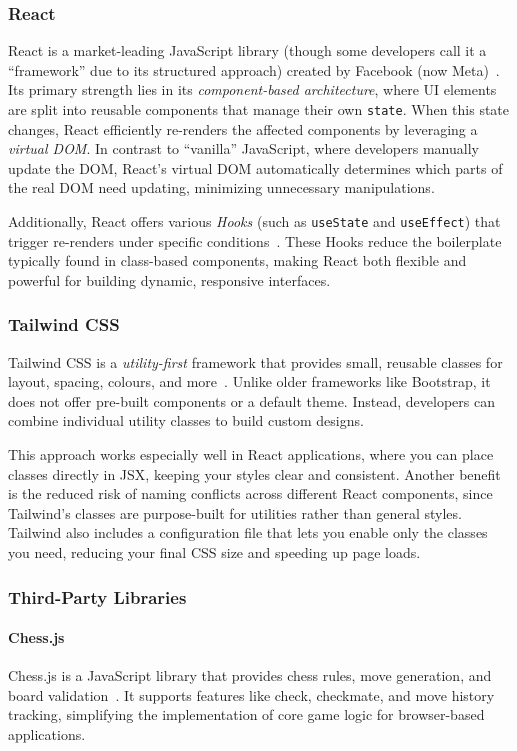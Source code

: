 \documentclass[12pt,a4paper]{article}
\begin{document}
\subsubsection*{React}
React is a market-leading JavaScript library (though some developers call it a “framework”
due to its structured approach) created by Facebook (now Meta)~\cite{ReactDocs}. Its primary strength lies in its \emph{component-based architecture}, where UI elements are split into reusable components that manage their own \texttt{state}. When this state changes, React efficiently re-renders the affected components by leveraging a \emph{virtual DOM}. In contrast to “vanilla” JavaScript, where developers manually update the DOM, React’s virtual DOM automatically determines which parts of the real DOM need updating, minimizing unnecessary manipulations.

Additionally, React offers various \textit{Hooks} (such as \texttt{useState} and \texttt{useEffect}) that trigger re-renders under specific conditions~\cite{ReactHooksDocs}. These Hooks reduce the boilerplate typically found in class-based components, making React both flexible and powerful for building dynamic, responsive interfaces.

\subsubsection*{Tailwind CSS}
Tailwind CSS is a \emph{utility-first} framework that provides small, reusable classes for layout, spacing, colours, and more~\cite{TailwindDocs}. Unlike older frameworks like Bootstrap, it does not offer pre-built components or a default theme. Instead, developers can combine individual utility classes to build custom designs.

This approach works especially well in React applications, where you can place classes
directly in JSX, keeping your styles clear and consistent. Another benefit is the reduced risk of naming conflicts across different React components, since Tailwind’s classes are purpose-built for utilities rather than general styles. Tailwind also includes a configuration file that lets you enable only the classes you need, reducing your final CSS size and speeding up page loads.

\subsubsection*{Third-Party Libraries}
\paragraph{Chess.js}
Chess.js is a JavaScript library that provides chess rules, move generation, and board
validation~\cite{chessjs}. It supports features like check, checkmate, and move history tracking, simplifying the implementation of core game logic for browser-based applications.
\end{document}
